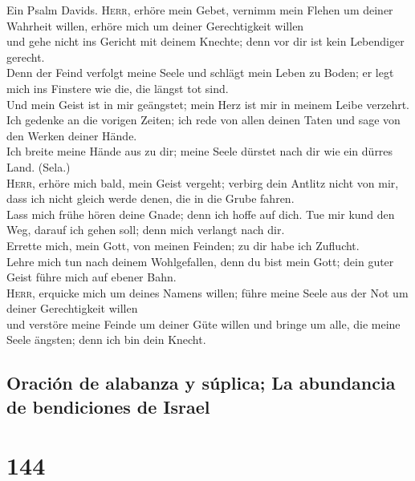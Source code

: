  Ein Psalm Davids. \textsc{Herr}, erhöre mein Gebet,
vernimm mein Flehen um deiner Wahrheit willen, erhöre mich um deiner
Gerechtigkeit willen\\
 und gehe nicht ins Gericht mit deinem Knechte; denn vor
dir ist kein Lebendiger gerecht.\\
 Denn der Feind verfolgt meine Seele und schlägt mein
Leben zu Boden; er legt mich ins Finstere wie die, die längst tot
sind.\\
 Und mein Geist ist in mir geängstet; mein Herz ist mir in
meinem Leibe verzehrt.\\
 Ich gedenke an die vorigen Zeiten; ich rede von allen
deinen Taten und sage von den Werken deiner Hände.\\
 Ich breite meine Hände aus zu dir; meine Seele dürstet
nach dir wie ein dürres Land. (Sela.)\\
 \textsc{Herr}, erhöre mich bald, mein Geist vergeht;
verbirg dein Antlitz nicht von mir, dass ich nicht gleich werde denen,
die in die Grube fahren.\\
 Lass mich frühe hören deine Gnade; denn ich hoffe auf
dich. Tue mir kund den Weg, darauf ich gehen soll; denn mich verlangt
nach dir.\\
 Errette mich, mein Gott, von meinen Feinden; zu dir habe
ich Zuflucht.\\
 Lehre mich tun nach deinem Wohlgefallen, denn du bist
mein Gott; dein guter Geist führe mich auf ebener Bahn.\\
 \textsc{Herr}, erquicke mich um deines Namens willen;
führe meine Seele aus der Not um deiner Gerechtigkeit willen\\
 und verstöre meine Feinde um deiner Güte willen und
bringe um alle, die meine Seele ängsten; denn ich bin dein Knecht.

\hypertarget{oraciuxf3n-de-alabanza-y-suxfaplica-la-abundancia-de-bendiciones-de-israel}{%
\subsection{Oración de alabanza y súplica; La abundancia de bendiciones
de
Israel}\label{oraciuxf3n-de-alabanza-y-suxfaplica-la-abundancia-de-bendiciones-de-israel}}

\hypertarget{section-143}{%
\section{144}\label{section-143}}

